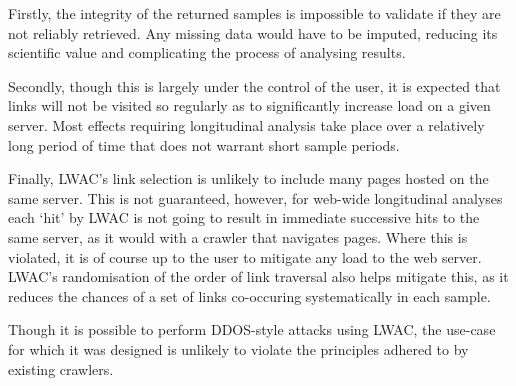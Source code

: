 Firstly, the integrity of the returned samples is impossible to validate if they are not reliably retrieved.  Any missing data would have to be imputed, reducing its scientific value and complicating the process of analysing results.

Secondly, though this is largely under the control of the user, it is expected that links will not be visited so regularly as to significantly increase load on a given server.  Most effects requiring longitudinal analysis take place over a relatively long period of time that does not warrant short sample periods.

Finally, LWAC's link selection is unlikely to include many pages hosted on the same server.  This is not guaranteed, however, for web-wide longitudinal analyses each `hit' by LWAC is not going to result in immediate successive hits to the same server, as it would with a crawler that navigates pages.  Where this is violated, it is of course up to the user to mitigate any load to the web server.  LWAC's randomisation of the order of link traversal also helps mitigate this, as it reduces the chances of a set of links co-occuring systematically in each sample.

Though it is possible to perform DDOS-style attacks using LWAC, the use-case for which it was designed is unlikely to violate the principles adhered to by existing crawlers.







